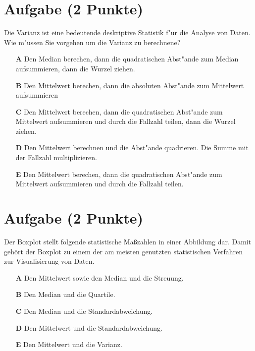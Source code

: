 \documentclass[a4paper, 9pt]{scrartcl}\usepackage[]{graphicx}\usepackage[]{xcolor}
\begin{document}
\section{Aufgabe \hfill (2 Punkte)}



Die Varianz ist eine bedeutende deskriptive Statistik f{"u}r die Analyse von Daten. Wie m{"u}ssen Sie vorgehen um die Varianz zu berechnene?



\begin{enumerate}
\item [\textbf{A} \msquare] Den Median berechen, dann die quadratischen Abst{"a}nde zum Median aufsummieren, dann die Wurzel ziehen.
\item [\textbf{B} \msquare] Den Mittelwert berechen, dann die absoluten Abst{"a}nde zum Mittelwert aufsummieren
\item [\textbf{C} \msquare] Den Mittelwert berechen, dann die quadratischen Abst{"a}nde zum Mittelwert aufsummieren und durch die Fallzahl teilen, dann die Wurzel ziehen.
\item [\textbf{D} \msquare] Den Mittelwert berechnen und die Abst{"a}nde quadrieren. Die Summe mit der Fallzahl multiplizieren.
\item [\textbf{E} \msquare] Den Mittelwert berechen, dann die quadratischen Abst{"a}nde zum Mittelwert aufsummieren und durch die Fallzahl teilen.
\end{enumerate} 

\section{Aufgabe \hfill (2 Punkte)}



Der Boxplot stellt folgende statistische Ma{\ss}zahlen in einer
Abbildung dar. Damit geh{\"o}rt der Boxplot zu einem der am meisten
genutzten statistischen Verfahren zur Visualisierung von Daten. 



\begin{enumerate}
\item [\textbf{A} \msquare] Den Mittelwert sowie den Median und die Streuung.
\item [\textbf{B} \msquare] Den Median und die Quartile.
\item [\textbf{C} \msquare] Den Median und die Standardabweichung.
\item [\textbf{D} \msquare] Den Mittelwert und die Standardabweichung.
\item [\textbf{E} \msquare] Den Mittelwert und die Varianz.
\end{enumerate}
\end{document}
